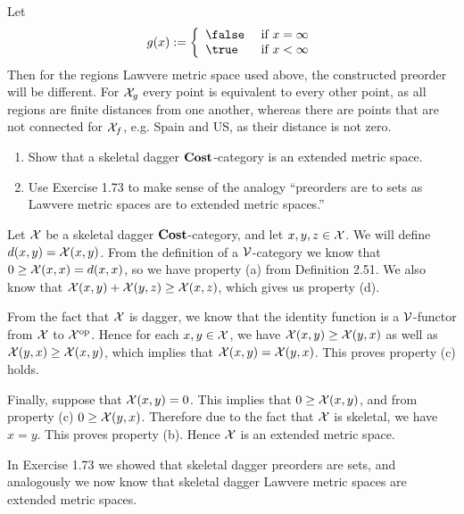 \solution
Let
$$g(x):=\left\{\begin{array}{ll}\false & \text { if } x=\infty \\ \true & \text { if } x<\infty\end{array}\right.$$
Then for the regions Lawvere metric space used above, the constructed preorder will be different.  For $\mathcal{X}_g$ every point is equivalent to every other point, as all regions are finite distances from one another, whereas there are points that are not connected for $\mathcal{X}_f$, e.g. Spain and US, as their distance is not zero.

\begin{enumerate}
	\item Show that a skeletal dagger $\textbf{Cost}$-category is an extended metric space.
	\item Use Exercise 1.73 to make sense of the analogy ``preorders are to sets as Lawvere metric spaces are to extended metric spaces.''
\end{enumerate}

\solution
Let $\mathcal{X}$ be a skeletal dagger $\textbf{Cost}$-category, and let $x,y,z\in\mathcal{X}$.  We will define $d(x,y)=\mathcal{X}(x,y)$.  From the definition of a $\mathcal{V}$-category we know that $0\geq\mathcal{X}(x,x)=d(x,x)$, so we have property (a) from Definition 2.51.  We also know that $\mathcal{X}(x,y)+\mathcal{X}(y,z)\geq \mathcal{X}(x,z)$, which gives us property (d).

From the fact that $\mathcal{X}$ is dagger, we know that the identity function is a $\mathcal{V}$-functor from $\mathcal{X}$ to $\mathcal{X}^\textrm{op}$.  Hence for each $x,y\in\mathcal{X}$, we have $\mathcal{X}(x,y)\geq\mathcal{X}(y,x)$ as well as $\mathcal{X}(y,x)\geq\mathcal{X}(x,y)$, which implies that $\mathcal{X}(x,y)=\mathcal{X}(y,x)$.  This proves property (c) holds.

Finally, suppose that $\mathcal{X}(x,y)=0$.  This implies that $0\geq \mathcal{X}(x,y)$, and from property (c) $0\geq\mathcal{X}(y,x)$.  Therefore due to the fact that $\mathcal{X}$ is skeletal, we have $x=y$.  This proves property (b).  Hence $\mathcal{X}$ is an extended metric space.

In Exercise 1.73 we showed that skeletal dagger preorders are sets, and analogously we now know that skeletal dagger Lawvere metric spaces are extended metric spaces.




